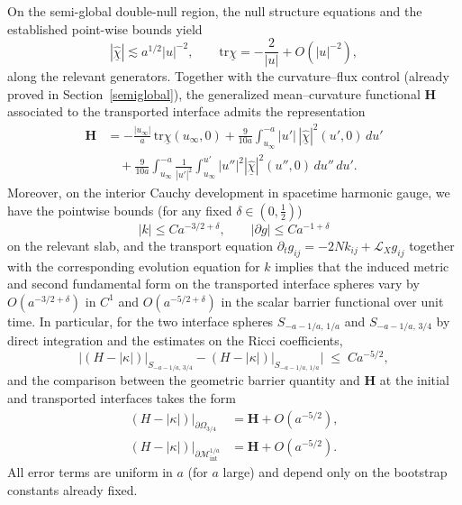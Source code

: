\documentclass{amsart}
\newcommand{\tr}{\mbox{tr}}
\begin{document}
{\noindent On the semi-global double-null region, the null structure equations and the established point-wise bounds yield
\[
|\widehat{\underline\chi}| \lesssim a^{1/2}|u|^{-2},
\qquad
\tr\underline\chi = -\frac{2}{|u|} + O(|u|^{-2}),
\]
along the relevant generators. Together with the curvature--flux control (already proved in Section~\ref{semiglobal}), the generalized mean--curvature functional $\mathbf H$ associated to the transported interface admits the representation
\begin{align}
\mathbf H
&=
-\frac{|u_\infty|}{a}\,\tr\underline\chi(u_\infty,0)
+\frac{9}{10a}\int_{u_\infty}^{-a} |u'|\,|\widehat{\underline\chi}|^{2}(u',0)\,du'
\nonumber\\
&\quad
+\frac{9}{10a}\int_{u_\infty}^{-a}\frac{1}{|u'|^{2}}
\int_{u_\infty}^{u'} |u''|^{2}|\widehat{\underline\chi}|^{2}(u'',0)\,du''\,du'.
\label{eq:H-functional-final-annals}
\end{align}
Moreover, on the interior Cauchy development in spacetime harmonic gauge, we have the pointwise bounds (for any fixed $\delta\in(0,\frac12)$)
\[
|k| \le C a^{-3/2+\delta},
\qquad
|\partial g| \le C a^{-1+\delta}
\]
on the relevant slab, and the transport equation $\partial_t g_{ij}=-2Nk_{ij}+\mathscr L_X g_{ij}$ together with the corresponding evolution equation for $k$ implies that the induced metric and second fundamental form on the transported interface spheres vary by $O(a^{-3/2+\delta})$ in $C^1$ and $O(a^{-5/2+\delta})$ in the scalar barrier functional over unit time. In particular, for the two interface spheres $S_{-a-1/a,\,1/a}$ and $S_{-a-1/a,\,3/4}$ by direct integration and the estimates on the Ricci coefficients,
\begin{equation}\label{eq:barrier-stability-final-annals}
\Big|
(H-|\kappa|)\big|_{S_{-a-1/a,\,3/4}}
-
(H-|\kappa|)\big|_{S_{-a-1/a,\,1/a}}
\Big|
\;\le\;
C a^{-5/2},
\end{equation}
and the comparison between the geometric barrier quantity and $\mathbf H$ at the initial and transported interfaces takes the form
\begin{align}
(H-|\kappa|)\big|_{\partial \Omega_{3/4}}
&=
\mathbf H + O(a^{-5/2}),
\nonumber\\
(H-|\kappa|)\big|_{\partial \mathcal M^{1/a}_{\mathrm{int}}}
&=
\mathbf H + O(a^{-5/2}).
\label{eq:barrier-compare-final-annals}
\end{align}
All error terms are uniform in $a$ (for $a$ large) and depend only on the bootstrap constants already fixed.

\medskip

}
\end{document}

